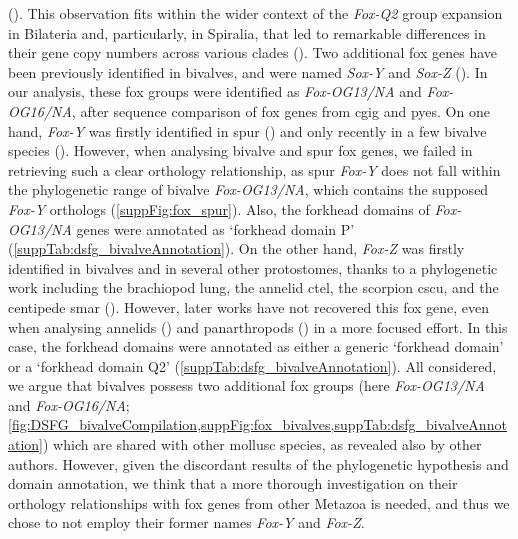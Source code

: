 (). This observation fits within the wider context of the \textit{Fox-Q2} group expansion in Bilateria and, particularly, in Spiralia, that led to remarkable differences in their gene copy numbers across various clades (). Two additional \gls{fox} genes have been previously identified in bivalves, and were named \textit{Sox-Y} and \textit{Sox-Z} (). In our analysis, these \gls{fox} groups were identified as \textit{Fox-OG13/NA} and \textit{Fox-OG16/NA}, after sequence comparison of \gls{fox} genes from \gls{cgig} and \gls{pyes}. On one hand, \textit{Fox-Y} was firstly identified in \gls{spur} () and only recently in a few bivalve species (). However, when analysing bivalve and \gls{spur} \gls{fox} genes, we failed in retrieving such a clear orthology relationship, as \gls{spur} \textit{Fox-Y} does not fall within the phylogenetic range of bivalve \textit{Fox-OG13/NA}, which contains the supposed \textit{Fox-Y} orthologs (\cref{suppFig:fox_spur}). Also, the forkhead domains of \textit{Fox-OG13/NA} genes were annotated as ‘forkhead domain P’ (\cref{suppTab:dsfg_bivalveAnnotation}). On the other hand, \textit{Fox-Z} was firstly identified in bivalves and in several other protostomes, thanks to a phylogenetic work including the brachiopod \gls{lung}, the annelid \gls{ctel}, the scorpion \gls{cscu}, and the centipede \gls{smar} (). However, later works have not recovered this \gls{fox} gene, even when analysing annelids () and panarthropods () in a more focused effort. In this case, the forkhead domains were annotated as either a generic ‘forkhead domain’ or a ‘forkhead domain Q2’ (\cref{suppTab:dsfg_bivalveAnnotation}). All considered, we argue that bivalves possess two additional \gls{fox} groups (here \textit{Fox-OG13/NA} and \textit{Fox-OG16/NA}; \cref{fig:DSFG_bivalveCompilation,suppFig:fox_bivalves,suppTab:dsfg_bivalveAnnotation}) which are shared with other mollusc species, as revealed also by other authors. However, given the discordant results of the phylogenetic hypothesis and domain annotation, we think that a more thorough investigation on their orthology relationships with \gls{fox} genes from other Metazoa is needed, and thus we chose to not employ their former names \textit{Fox-Y} and \textit{Fox-Z}.

